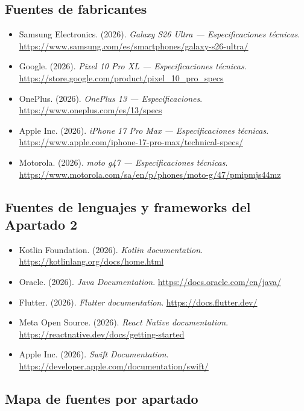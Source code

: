 \documentclass[11pt,a4paper]{article}
\begin{document}
	\subsection*{Fuentes de fabricantes}
	{\footnotesize
		\begin{itemize}[leftmargin=*,itemsep=0.02em,topsep=0.1em,label={}]
			\item Samsung Electronics. (2026). \emph{Galaxy S26 Ultra --- Especificaciones técnicas}. \url{https://www.samsung.com/es/smartphones/galaxy-s26-ultra/}
			\item Google. (2026). \emph{Pixel 10 Pro XL --- Especificaciones técnicas}. \url{https://store.google.com/product/pixel_10_pro_specs}
			\item OnePlus. (2026). \emph{OnePlus 13 --- Especificaciones}. \url{https://www.oneplus.com/es/13/specs}
			\item Apple Inc. (2026). \emph{iPhone 17 Pro Max --- Especificaciones técnicas}. \url{https://www.apple.com/iphone-17-pro-max/technical-specs/}
			\item Motorola. (2026). \emph{moto g47 --- Especificaciones técnicas}. \url{https://www.motorola.com/sa/en/p/phones/moto-g/47/pmipmjs44mz}
		\end{itemize}
	}
	
	\subsection*{Fuentes de lenguajes y frameworks del Apartado 2}
	{\footnotesize
		\begin{itemize}[leftmargin=*,itemsep=0.02em,topsep=0.1em,label={}]
			\item Kotlin Foundation. (2026). \emph{Kotlin documentation}. \url{https://kotlinlang.org/docs/home.html}
			\item Oracle. (2026). \emph{Java Documentation}. \url{https://docs.oracle.com/en/java/}
			\item Flutter. (2026). \emph{Flutter documentation}. \url{https://docs.flutter.dev/}
			\item Meta Open Source. (2026). \emph{React Native documentation}. \url{https://reactnative.dev/docs/getting-started}
			\item Apple Inc. (2026). \emph{Swift Documentation}. \url{https://developer.apple.com/documentation/swift/}
		\end{itemize}
	}
	
	\subsection*{Mapa de fuentes por apartado}
	
\end{document}
